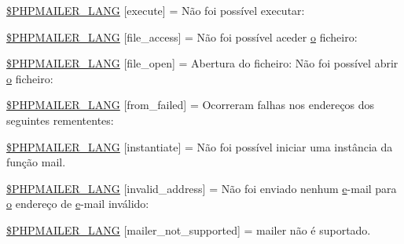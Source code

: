 \begin{DoxyCompactItemize}
\item 
\hyperlink{phpmailer_8lang-pt_8php_a668217a9563a168f30f2a8548b6ed5a9}{\$\+P\+H\+P\+M\+A\+I\+L\+E\+R\+\_\+\+L\+A\+NG} \mbox{[}\textquotesingle{}execute\textquotesingle{}\mbox{]} = \textquotesingle{}Não foi possível executar\+: \textquotesingle{}
\item 
\hyperlink{phpmailer_8lang-pt_8php_a7e83349023b856ef9e5c46e30ae6d51e}{\$\+P\+H\+P\+M\+A\+I\+L\+E\+R\+\_\+\+L\+A\+NG} \mbox{[}\textquotesingle{}file\+\_\+access\textquotesingle{}\mbox{]} = \textquotesingle{}Não foi possível aceder \hyperlink{fullpage_2plugin_8min_8js_a4afc7c854f61c136d7bcfa8997651b88}{o} ficheiro\+: \textquotesingle{}
\item 
\hyperlink{phpmailer_8lang-pt_8php_a28d1a6517bf4c942a0ddd506188ad2e0}{\$\+P\+H\+P\+M\+A\+I\+L\+E\+R\+\_\+\+L\+A\+NG} \mbox{[}\textquotesingle{}file\+\_\+open\textquotesingle{}\mbox{]} = \textquotesingle{}Abertura do ficheiro\+: Não foi possível abrir \hyperlink{fullpage_2plugin_8min_8js_a4afc7c854f61c136d7bcfa8997651b88}{o} ficheiro\+: \textquotesingle{}
\item 
\hyperlink{phpmailer_8lang-pt_8php_adf832ae12155a09be077c6d5e4fd7e22}{\$\+P\+H\+P\+M\+A\+I\+L\+E\+R\+\_\+\+L\+A\+NG} \mbox{[}\textquotesingle{}from\+\_\+failed\textquotesingle{}\mbox{]} = \textquotesingle{}Ocorreram falhas nos endereços dos seguintes remententes\+: \textquotesingle{}
\item 
\hyperlink{phpmailer_8lang-pt_8php_ad58dde16780f4770ccf4dd282ea1f5ad}{\$\+P\+H\+P\+M\+A\+I\+L\+E\+R\+\_\+\+L\+A\+NG} \mbox{[}\textquotesingle{}instantiate\textquotesingle{}\mbox{]} = \textquotesingle{}Não foi possível iniciar uma instância da função mail.\textquotesingle{}
\item 
\hyperlink{phpmailer_8lang-pt_8php_a42d61bcea4c79599ecb44fd062f54d47}{\$\+P\+H\+P\+M\+A\+I\+L\+E\+R\+\_\+\+L\+A\+NG} \mbox{[}\textquotesingle{}invalid\+\_\+address\textquotesingle{}\mbox{]} = \textquotesingle{}Não foi enviado nenhum \hyperlink{jquery-ui_8min_8js_abea95a4e94bc6f4151d5683d4c12c3f4}{e}-\/mail para \hyperlink{fullpage_2plugin_8min_8js_a4afc7c854f61c136d7bcfa8997651b88}{o} endereço de \hyperlink{jquery-ui_8min_8js_abea95a4e94bc6f4151d5683d4c12c3f4}{e}-\/mail inválido\+: \textquotesingle{}
\item 
\hyperlink{phpmailer_8lang-pt_8php_aa2ebcb8833ee83a7ad67401c4bb3a6ad}{\$\+P\+H\+P\+M\+A\+I\+L\+E\+R\+\_\+\+L\+A\+NG} \mbox{[}\textquotesingle{}mailer\+\_\+not\+\_\+supported\textquotesingle{}\mbox{]} = \textquotesingle{} mailer não é suportado.\textquotesingle{}
\item 

\end{DoxyCompactItemize}
